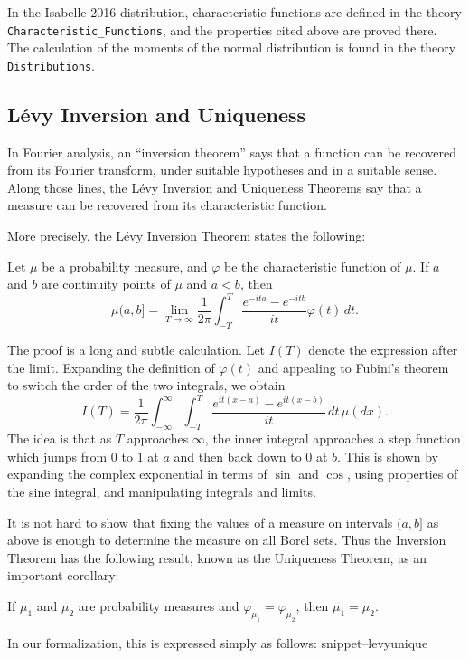 \documentclass{svjour3}
\newcommand{\ph}{\varphi}
\newcommand{\Snippet}[1]{\csname snippet--#1\endcsname}
\begin{document}
In the Isabelle 2016 distribution, characteristic functions are defined in the theory \texttt{Characteristic\_Functions}, and the properties cited above are proved there. The calculation of the moments of the normal distribution is found in the theory \texttt{Distributions}.

\subsection{L\'evy Inversion and Uniqueness}

In Fourier analysis, an ``inversion theorem'' says that a function can be recovered from its Fourier transform, under suitable hypotheses and in a suitable sense. Along those lines, the L\'evy Inversion and Uniqueness Theorems say that a measure can be recovered from its characteristic function.

More precisely, the L\'evy Inversion Theorem states the following:
\begin{theorem}
Let $\mu$ be a probability measure, and $\ph$ be the characteristic function of $\mu$. If $a$ and $b$ are continuity points of $\mu$ and $a < b$, then
\[
\mu (a,b] = \lim_{T \rightarrow \infty} \frac{1}{2\pi} \int_{-T}^T \frac{e^{-ita} - e^{-itb}}{it} \ph(t) \, dt.
\]
\end{theorem}

The proof is a long and subtle calculation. Let $I(T)$ denote the expression after the limit. Expanding the definition of $\ph(t)$ and appealing to Fubini's theorem to switch the order of the two integrals, we obtain
\[
I(T) = \frac{1}{2\pi} \int_{-\infty}^\infty \int_{-T}^T \frac{e^{it(x-a)} - e^{it(x-b)}}{it} \, dt \, \mu(dx).
\]
The idea is that as $T$ approaches $\infty$, the inner integral approaches a step function which jumps from $0$ to $1$ at $a$ and then back down to $0$ at $b$. This is shown by expanding the complex exponential in terms of $\sin$ and $\cos$, using properties of the sine integral, and manipulating integrals and limits.

It is not hard to show that fixing the values of a measure on intervals $(a, b]$ as above is enough to determine the measure on all Borel sets. Thus the Inversion Theorem has the following result, known as the Uniqueness Theorem, as an important corollary:
\begin{theorem}
If $\mu_1$ and $\mu_2$ are probability measures and $\ph_{\mu_1} = \ph_{\mu_2}$, then $\mu_1 = \mu_2$.
\end{theorem}
In our formalization, this is expressed simply as follows:
\Snippet{levyunique}
\end{document}
